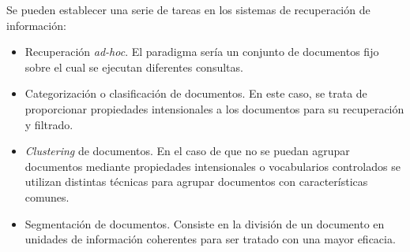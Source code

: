 Se pueden establecer una serie de tareas en los sistemas de 
recuperación de información:
\begin{itemize}
 \item Recuperación \textit{ad-hoc}. El paradigma sería un conjunto de
documentos fijo sobre el cual se ejecutan diferentes consultas.
\item Categorización o clasificación de documentos. En este caso, 
se trata de proporcionar propiedades intensionales a los documentos 
para su recuperación y filtrado.
\item \textit{Clustering} de documentos. En el caso de que no se puedan 
agrupar documentos mediante propiedades intensionales o vocabularios 
controlados se utilizan distintas técnicas para agrupar documentos 
con características comunes.
\item Segmentación de documentos. Consiste en la división de un documento 
en unidades de información coherentes para ser tratado con una mayor eficacia.
\end{itemize}

